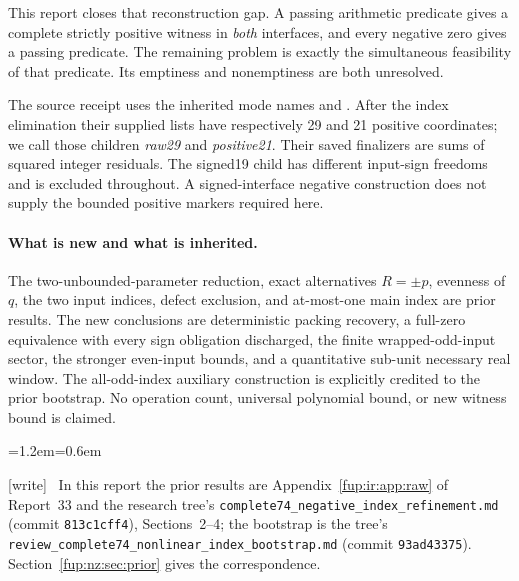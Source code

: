 \documentclass[11pt,letterpaper]{article}
\theoremstyle{definition}\newtheorem{definition}[theorem]{Definition}
\theoremstyle{remark}\newtheorem{remark}[theorem]{Remark}
\newcommand{\code}[1]{\texttt{\detokenize{#1}}}
\newcommand{\wtag}{\textup{[write]}}
\newenvironment{writenote}{\par\smallskip\begin{list}{}{\leftmargin=1.2em\rightmargin=0.6em}\item[]\small\wtag\ }{\end{list}\smallskip}
\newcommand{\rw}[1]{\nolinkurl{#1}}%
\begin{document}
This report closes that reconstruction gap. A passing arithmetic predicate gives a complete strictly positive witness in \emph{both} interfaces, and every negative zero gives a passing predicate. The remaining problem is exactly the simultaneous feasibility of that predicate. Its emptiness and nonemptiness are both unresolved.

The source receipt uses the inherited mode names \code{raw30} and \code{positive22}. After the index elimination their supplied lists have respectively 29 and 21 positive coordinates; we call those children \emph{raw29} and \emph{positive21}. Their saved finalizers are sums of squared integer residuals. The signed19 child has different input-sign freedoms and is excluded throughout. A signed-interface negative construction does not supply the bounded positive markers required here.

\paragraph{What is new and what is inherited.}
The two-unbounded-parameter reduction, exact alternatives $R=\pm p$, evenness of $q$, the two input indices, defect exclusion, and at-most-one main index are prior results. The new conclusions are deterministic packing recovery, a full-zero equivalence with every sign obligation discharged, the finite wrapped-odd-input sector, the stronger even-input bounds, and a quantitative sub-unit necessary real window. The all-odd-index auxiliary construction is explicitly credited to the prior bootstrap. No operation count, universal polynomial bound, or new witness bound is claimed.
\begin{writenote}
In this report the prior results are Appendix~\ref{fup:ir:app:raw} of Report~33 and the research tree's \rw{complete74_negative_index_refinement.md} (commit \texttt{813c1cff4}), Sections~2--4; the bootstrap is the tree's \rw{review_complete74_nonlinear_index_bootstrap.md} (commit \texttt{93ad43375}). Section~\ref{fup:nz:sec:prior} gives the correspondence.
\end{writenote}
\end{document}
